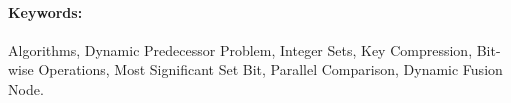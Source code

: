 
\paragraph*{Keywords:} Algorithms, Dynamic Predecessor Problem, Integer Sets, Key Compression, Bit-wise Operations, Most Significant Set Bit, Parallel Comparison, Dynamic Fusion Node.

    
    
    


